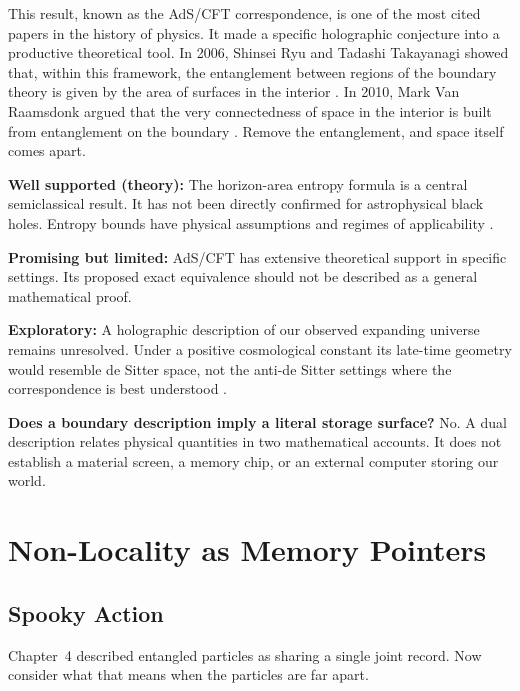 This result, known as the AdS/CFT correspondence, is one of the most cited papers in the history of physics. It made a specific holographic conjecture into a productive theoretical tool. In 2006, Shinsei Ryu and Tadashi Takayanagi showed that, within this framework, the entanglement between regions of the boundary theory is given by the area of surfaces in the interior \cite{ryu2006}. In 2010, Mark Van Raamsdonk argued that the very connectedness of space in the interior is built from entanglement on the boundary \cite{vanraamsdonk2010}. Remove the entanglement, and space itself comes apart.

\begin{researchnotebox}
\textbf{Well supported (theory):} The horizon-area entropy formula is a central semiclassical result. It has not been directly confirmed for astrophysical black holes. Entropy bounds have physical assumptions and regimes of applicability \cite{hawking1975,bousso2002}.

\textbf{Promising but limited:} AdS/CFT has extensive theoretical support in specific settings. Its proposed exact equivalence should not be described as a general mathematical proof.

\textbf{Exploratory:} A holographic description of our observed expanding universe remains unresolved. Under a positive cosmological constant its late-time geometry would resemble de Sitter space, not the anti-de Sitter settings where the correspondence is best understood \cite{bousso2002}.
\end{researchnotebox}

\begin{commonquestionbox}
\textbf{Does a boundary description imply a literal storage surface?} No. A dual description relates physical quantities in two mathematical accounts. It does not establish a material screen, a memory chip, or an external computer storing our world.
\end{commonquestionbox}

\section{Non-Locality as Memory Pointers}

\subsection{Spooky Action}

Chapter~4 described entangled particles as sharing a single joint record. Now consider what that means when the particles are far apart.

